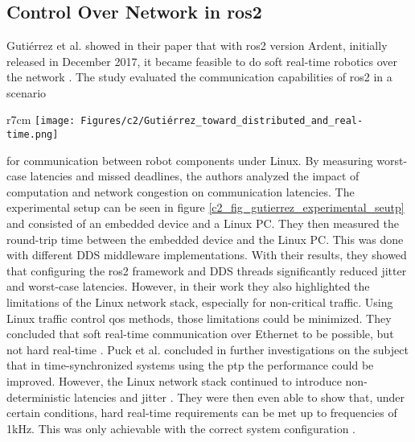 \chapter{}
\label{sec:state_of_the_art}
\section{Control Over Network in \gls{ros2}}\label{c2_sec_control_over_network}
Gutiérrez et al. showed in their paper that with \gls{ros2} version Ardent, initially released in December 2017, it became feasible to do soft real-time robotics over the network \cite{gutierrez_towards_2018}. The study evaluated the communication capabilities of \gls{ros2} in a scenario
\begin{wrapfigure}{r}{7cm}
\texttt{[image: Figures/c2/Gutiérrez\_toward\_distributed\_and\_real-time.png]}
\caption{The experimental setup used by Gutiérrez et al. to evaluate the real-time performance of \gls{ros2} communication over Ethernet. Figure taken from \cite{gutierrez_towards_2018}.} \label{c2_fig_gutierrez_experimental_seutp}
\end{wrapfigure}
for communication between robot components under Linux. By measuring worst-case latencies and missed deadlines, the authors analyzed the impact of computation and network congestion on communication latencies. The experimental setup can be seen in figure \ref{c2_fig_gutierrez_experimental_seutp} and consisted of an embedded device and a Linux PC. They then measured the round-trip time between the embedded device and the Linux PC. This was done with different DDS middleware implementations. With their results, they showed that configuring the \gls{ros2} framework and DDS threads significantly reduced jitter and worst-case latencies. However, in their work they also highlighted the limitations of the Linux network stack, especially for non-critical traffic. Using Linux traffic control \gls{qos} methods, those limitations could be minimized. They concluded that soft real-time communication over Ethernet to be possible, but not hard real-time \cite{gutierrez_towards_2018}. \newline
Puck et al. concluded in further investigations on the subject that in time-synchronized systems using the \gls{ptp} the performance could be improved. However, the Linux network stack continued to introduce non-deterministic latencies and jitter \cite{puck_distributed_2020}. They were then even able to show that, under certain conditions, hard real-time requirements can be met up to frequencies of 1kHz. This was only achievable with the correct system configuration \cite{puck_performance_2021}.\newline
